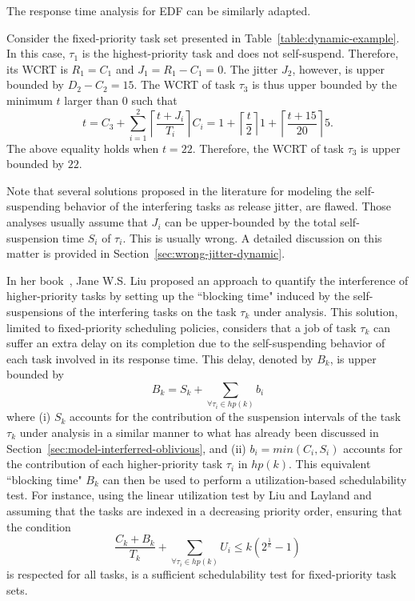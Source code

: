 The response time analysis for EDF can be similarly adapted.

\begin{example}
\label{ex:suspension-jitter}    
Consider the fixed-priority task set presented in Table~\ref{table:dynamic-example}. In this case, $\tau_1$ is the highest-priority task and does not self-suspend. Therefore, its WCRT is $R_1 = C_1$ and $J_1 = R_1 - C_1 = 0$. The jitter $J_2$, however, is upper bounded by $D_2 - C_2 =15$. The WCRT of task $\tau_3$ is thus upper bounded by the minimum $t$ larger than $0$ such that 
$$t=C_3+ \sum_{i=1}^2\left\lceil \frac{t + J_i}{T_i} \right\rceil C_i = 1+\left\lceil \frac{t}{2} \right\rceil 1 +\left\lceil \frac{t+15}{20} \right\rceil 5.$$ 
The above equality holds when $t=22$. Therefore, the WCRT of task $\tau_{3}$ is upper bounded by $22$.
\hfill\myendproof  
\end{example}

Note that several solutions proposed in the literature \cite{ECRTS-AudsleyB04,RTAS-AudsleyB04,RTCSA-KimCPKH95} for modeling the 
self-suspending behavior of the interfering tasks as release jitter, are flawed. Those analyses usually assume that $J_i$ can be 
upper-bounded by the total self-suspension time $S_i$ of $\tau_i$. This is usually wrong. A detailed discussion on this matter is 
provided in Section~\ref{sec:wrong-jitter-dynamic}. 

\label{sec:model-interfering-blocking}

In her book~\cite[Pages 164-165]{Liu:2000:RS:518501}, Jane W.S. Liu proposed an approach to quantify the interference of
higher-priority tasks by setting up the ``blocking time" induced by the self-suspensions of the interfering tasks on the 
task $\tau_k$ under analysis. This solution, limited to fixed-priority scheduling policies, considers that a job of 
task $\tau_k$ can suffer an extra delay on its completion due to the self-suspending behavior of each task involved in its 
response time. This delay, denoted by $B_k$, is upper bounded by 
\begin{equation*}
B_k=S_k+\sum_{\forall \tau_i \in hp(k)} b_i
\end{equation*}
where (i) $S_k$ accounts for the contribution of the suspension intervals of the task $\tau_k$ under analysis in a similar manner to 
what has already been discussed in Section~\ref{sec:model-interferred-oblivious}, and (ii) $b_i=min(C_i, S_i)$ accounts for the contribution of each higher-priority task $\tau_i$ in $hp(k)$. This equivalent ``blocking time" $B_k$ can then be used to perform a utilization-based schedulability test. For instance, using the linear utilization test by Liu and Layland \cite{Liu_1973} and assuming that the tasks are indexed in a decreasing priority order, ensuring that the condition
\begin{equation*}
\frac{C_k+B_k}{T_k} + \sum_{\forall \tau_i \in hp(k)} U_i \leq k (2^{\frac{1}{k}}-1)
\end{equation*}
is respected for all tasks, is a sufficient schedulability test for fixed-priority task sets.

